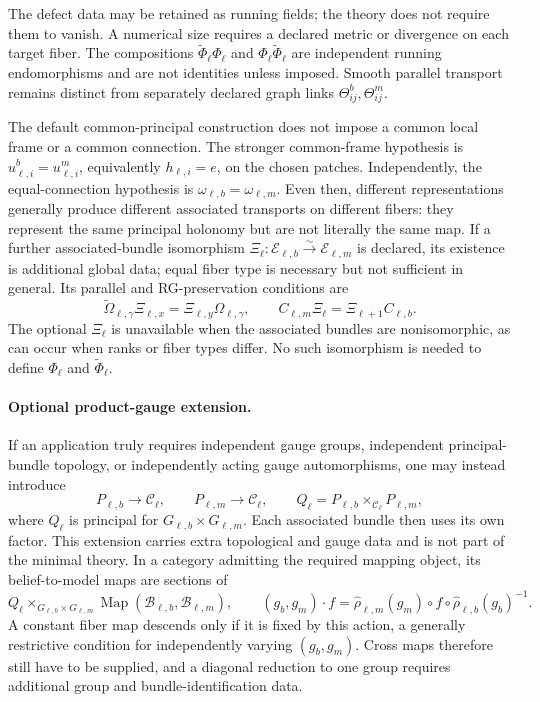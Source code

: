 The defect data may be retained as running fields; the theory does not
require them to vanish. A numerical size requires a declared metric or
divergence on each target fiber. The compositions
\(\widetilde\Phi_\ell\Phi_\ell\) and
\(\Phi_\ell\widetilde\Phi_\ell\) are independent running endomorphisms and
are not identities unless imposed. Smooth parallel transport remains
distinct from separately declared graph links
\(\Theta^b_{ij},\Theta^m_{ij}\). 

The default common-principal construction does not impose a common local
frame or a common connection. The stronger common-frame hypothesis is
\(u^b_{\ell,i}=u^m_{\ell,i}\), equivalently
\(h_{\ell,i}=e\), on the chosen patches. Independently, the equal-connection
hypothesis is \(\omega_{\ell,b}=\omega_{\ell,m}\). Even then, different
representations generally produce different associated transports on
different fibers: they represent the same principal holonomy but are not
literally the same map. If a further associated-bundle isomorphism
\(\Xi_\ell:\mathcal E_{\ell,b}\xrightarrow{\sim}\mathcal E_{\ell,m}\) is
declared, its existence is additional global data; equal fiber type is
necessary but not sufficient in general. Its parallel and RG-preservation
conditions are
\[
\widetilde\Omega_{\ell,\gamma}\Xi_{\ell,x}
=\Xi_{\ell,y}\Omega_{\ell,\gamma},\qquad
C_{\ell,m}\Xi_\ell=\Xi_{\ell+1}C_{\ell,b}.
\]
The optional \(\Xi_\ell\) is unavailable when the associated bundles are
nonisomorphic, as can occur when ranks or fiber types differ. No such
isomorphism is needed to define \(\Phi_\ell\) and
\(\widetilde\Phi_\ell\). 

\paragraph{Optional product-gauge extension.}
If an application truly requires independent gauge groups, independent
principal-bundle topology, or independently acting gauge automorphisms, one
may instead introduce
\[
P_{\ell,b}\to\mathcal C_\ell,\qquad
P_{\ell,m}\to\mathcal C_\ell,\qquad
Q_\ell=P_{\ell,b}\times_{\mathcal C_\ell}P_{\ell,m},
\]
where \(Q_\ell\) is principal for
\(G_{\ell,b}\times G_{\ell,m}\). Each associated bundle then uses its own
factor. This extension carries extra topological and gauge data and is not
part of the minimal theory. In a category admitting the required mapping
object, its belief-to-model maps are sections of
\[
Q_\ell\times_{G_{\ell,b}\times G_{\ell,m}}
\operatorname{Map}(\mathcal B_{\ell,b},\mathcal B_{\ell,m}),
\qquad
(g_b,g_m)\cdot f
=\widehat\rho_{\ell,m}(g_m)\circ f\circ
\widehat\rho_{\ell,b}(g_b)^{-1}.
\]
A constant fiber map descends only if it is fixed by this action, a generally
restrictive condition for independently varying \((g_b,g_m)\). Cross maps
therefore still have to be supplied, and a diagonal reduction to one group
requires additional group and bundle-identification data. 

